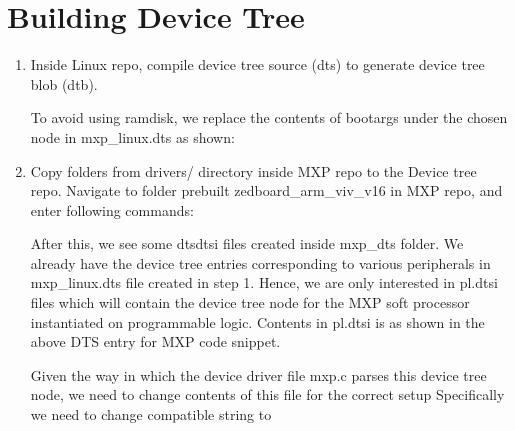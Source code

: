 \section{Building Device Tree}

\begin{enumerate}
	\item Inside Linux repo, compile device tree source (dts) to generate device tree blob (dtb).

		
	
	To avoid using ramdisk, we replace the contents of bootargs under the chosen node in mxp\_linux.dts as shown:
	
		
		
	\item Copy folders from drivers/ directory inside MXP repo to the Device tree repo. Navigate to folder prebuilt zedboard\_arm\_viv\_v16 in MXP repo, and enter following commands:
	
			
			

  
			
			After this, we see some dts\/dtsi files created inside mxp\_dts folder. We already have the device tree entries corresponding to various peripherals in mxp\_linux.dts file created in step 1. Hence, we are only interested in pl.dtsi files which will contain the device tree node for the MXP soft processor instantiated on programmable logic. Contents in pl.dtsi is as shown in the above DTS entry for MXP code snippet. 
		
		Given the way in which the device driver file mxp.c parses this device tree
		node, we need to change contents of this file for the correct setup Specifically we need to change compatible string to
	

\end{enumerate}
